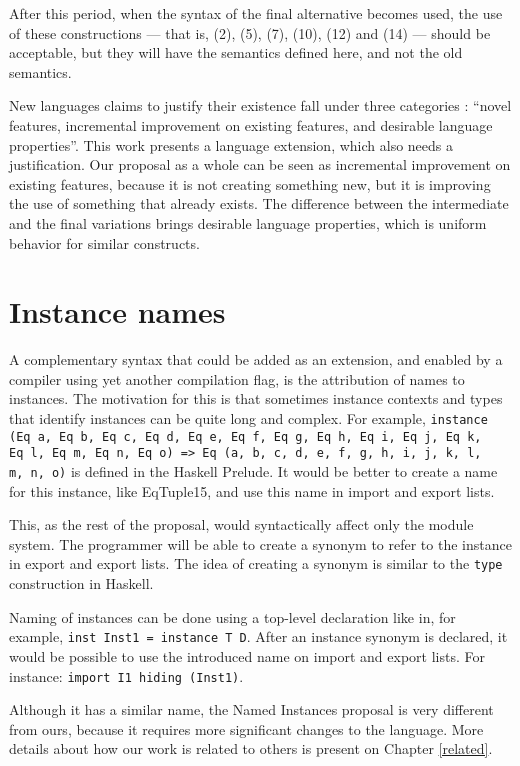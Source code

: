\documentclass[msc]{ppgccufmg}
\begin{document}
After this period, when the syntax of the final alternative becomes used, the use of these
constructions --- that is, (2), (5), (7), (10), (12) and (14) --- should be acceptable, but
they will have the semantics defined here, and not the old semantics.

New languages claims to justify their
existence fall under three categories \citep[p.~1]{claims}: ``novel features, incremental improvement on
existing features, and desirable language properties''.  This work presents
a language extension, which also needs a justification.  Our proposal as a whole can be seen as incremental improvement
on existing features, because it is not creating something new, but it is
improving the use of something that already exists.  The difference between the
intermediate and the final variations brings desirable language properties, which is
uniform behavior for similar constructs.

\section{Instance names}
\label{Instance-names}
A complementary syntax that could be added as an extension, and
enabled by a compiler using yet another compilation flag, is the
attribution of names to instances.  The motivation for this is that
sometimes instance contexts and types that identify instances can be
quite long and complex.  For example, \texttt{instance (Eq a, Eq b, Eq
  c, Eq d, Eq e, Eq f, Eq g, Eq h, Eq i, Eq j, Eq k,\\Eq l, Eq m, Eq n,
  Eq o) => Eq (a, b, c, d, e, f, g, h, i, j, k, l,\\m, n, o)} is
defined in the Haskell Prelude.  It would be better to create a name for
this instance, like EqTuple15, and use this name in import and export
lists.

This, as the rest of the proposal, would syntactically affect only the module
system.  The programmer will be able to create a synonym to refer to the
instance in export and export lists.  The idea of creating a synonym is similar
to the \texttt{type} construction in Haskell.

Naming of instances can be done using a top-level declaration like in, for
example, \texttt{inst Inst1 = instance
  T D}.  After an instance synonym is declared, it would be possible to use the
introduced name on import and export lists.  For instance: \texttt{import
  I1 hiding (Inst1)}.

Although it has a similar name, the Named Instances proposal
\citep{named} is very different from ours, because it requires more
significant changes to the language.  More details about how our work
is related to others is present on Chapter \ref{related}.
\end{document}
